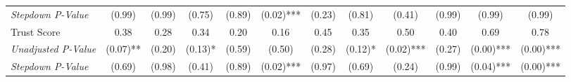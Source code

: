 \begin{tabular}{l c c c c c c c c c c c}
\quad \textit{Stepdown P-Value} & (0.99) & (0.99) & (0.75) & (0.89) & (0.02)*** & (0.23) & (0.81) & (0.41) & (0.99) & (0.99) & (0.99) \\
Trust Score & 0.38 & 0.28 & 0.34 & 0.20 & 0.16 & 0.45 & 0.35 & 0.50 & 0.40 & 0.69 & 0.78 \\
\quad \textit{Unadjusted P-Value} & (0.07)** & (0.20) & (0.13)* & (0.59) & (0.50) & (0.28) & (0.12)* & (0.02)*** & (0.27) & (0.00)*** & (0.00)*** \\
\quad \textit{Stepdown P-Value} & (0.69) & (0.98) & (0.41) & (0.89) & (0.02)*** & (0.97) & (0.69) & (0.24) & (0.99) & (0.04)*** & (0.00)*** \\
\bottomrule
\end{tabular}
